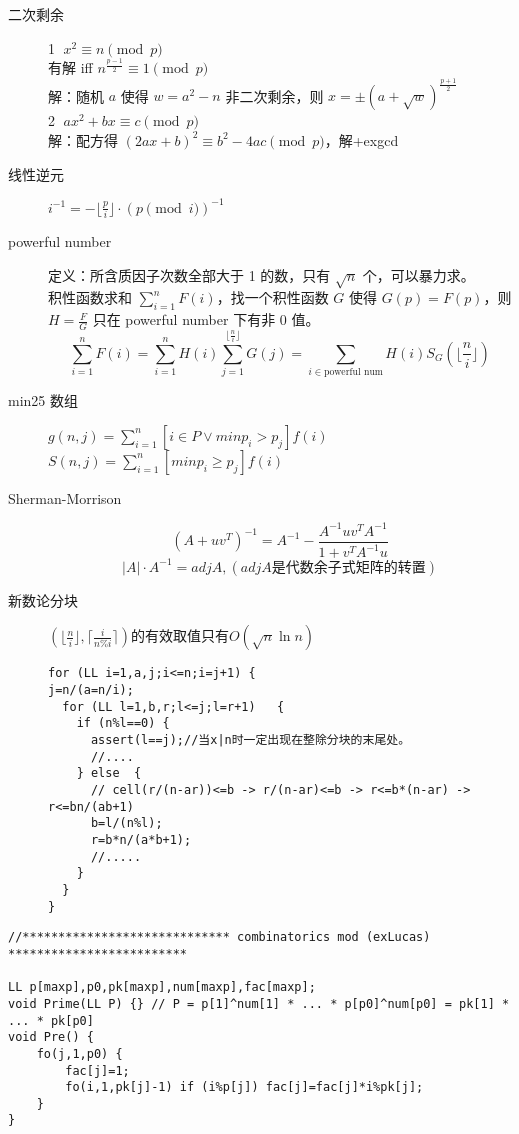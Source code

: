 \documentclass[6pt]{article}
\begin{document}
\begin{multicols}{2}
\begin{description}
    \item[二次剩余] \textcircled{1} $x^2 \equiv n \pmod p$ \\
          有解 iff $n^{\frac{p-1}{2}} \equiv 1 \pmod p$ \\
          解：随机 $a$ 使得 $w = a^2 - n$ 非二次剩余，则 $x = \pm (a+ \sqrt w)^{\frac{p+1}{2}}$ \\
          \textcircled{2} $ax^2 + bx \equiv c \pmod p$ \\
          解：配方得 $(2ax+b)^2 \equiv b^2 - 4ac \pmod p$，解+exgcd
    \item[线性逆元] $i^{-1} = - \lfloor \frac{p}{i} \rfloor \cdot (p \pmod i)^{-1}$
    \item[powerful number] 定义：所含质因子次数全部大于 1 的数，只有 $\sqrt n$ 个，可以暴力求。\\
          积性函数求和 $\sum_{i=1}^n F(i)$，找一个积性函数 $G$ 使得 $G(p) = F(p)$，则 $H = \frac FG$ 只在 powerful number 下有非 0 值。
          $$
            \sum_{i=1}^n F(i) = \sum_{i=1}^n H(i) \sum_{j=1}^{\lfloor \frac ni \rfloor} G(j) = \sum_{i \in \text{powerful num}} H(i) S_G(\lfloor \frac ni \rfloor)
          $$
    \item[min25 数组] $g(n,j) = \sum_{i=1}^n [i \in P \lor minp_i > p_j] f(i)$ \\
          $S(n,j) = \sum_{i=1}^n [minp_i \ge p_j] f(i)$
    \item[Sherman-Morrison] $$(A+uv^T)^{-1}=A^{-1}-\frac{A^{-1}uv^TA^{-1}}{1+v^TA^{-1}u}$$
          $$|A|\cdot A^{-1}=adj A,(adj A\text{是代数余子式矩阵的转置})$$

    \item[新数论分块] $(\lfloor \frac{n}{i}\rfloor,\lceil\frac{i}{n\%i}\rceil)$的有效取值只有$O(\sqrt n \ln n)$
          \begin{lstlisting}
for (LL i=1,a,j;i<=n;i=j+1)	{
j=n/(a=n/i);
  for (LL l=1,b,r;l<=j;l=r+1)	{
    if (n%l==0)	{
      assert(l==j);//当x|n时一定出现在整除分块的末尾处。
      //....
    } else	{
      // cell(r/(n-ar))<=b -> r/(n-ar)<=b -> r<=b*(n-ar) -> r<=bn/(ab+1)
      b=l/(n%l);
      r=b*n/(a*b+1);
      //.....
    }
  }
}
\end{lstlisting}

  \end{description}

  \begin{lstlisting}
//***************************** combinatorics mod (exLucas) *************************

LL p[maxp],p0,pk[maxp],num[maxp],fac[maxp];
void Prime(LL P) {} // P = p[1]^num[1] * ... * p[p0]^num[p0] = pk[1] * ... * pk[p0]
void Pre() {
    fo(j,1,p0) {
        fac[j]=1;
        fo(i,1,pk[j]-1) if (i%p[j]) fac[j]=fac[j]*i%pk[j];
    }
}


\end{lstlisting}
\end{multicols}
\end{document}
